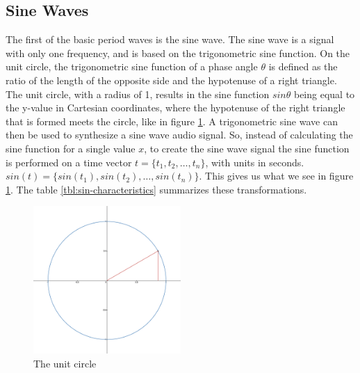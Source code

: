 \subsection{Sine Waves}\label{subsection:sine-waves}
The first of the basic period waves is the sine wave. The sine wave is a signal with only one frequency, and is based on the trigonometric sine function. On the unit circle, the trigonometric sine function of a phase angle $\theta$ is defined as the ratio of the length of the opposite side and the hypotenuse of a right triangle. The unit circle, with a radius of 1, results in the sine function $sin\theta$ being equal to the y-value in Cartesian coordinates, where the hypotenuse of the right triangle that is formed meets the circle, like in figure \ref{fig:unit-circle}. A trigonometric sine wave can then be used to synthesize a sine wave audio signal. So, instead of calculating the sine function for a single value $x$, to create the sine wave signal the sine function is performed on a time vector $t = \{t_1, t_2, \dots, t_n\}$, with units in seconds. $sin(t) = \{sin(t_1), sin(t_2), \dots, sin(t_n)\}$. This gives us what we see in figure \ref{fig:unit-circle}. The table \ref{tbl:sin-characteristics} summarizes these transformations.

\begin{figure}
	\centering
	\includegraphics[width=0.5\textwidth]{figures/unit-circle.png}
	\caption{The unit circle}
	\label{fig:unit-circle}
\end{figure}

